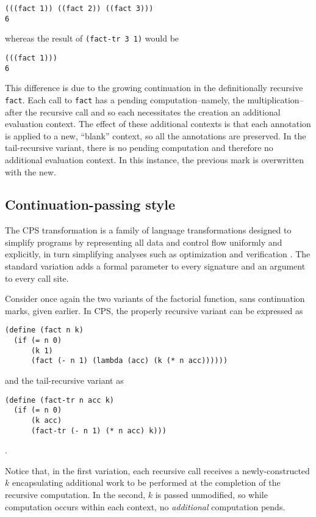 \documentclass[ms]{byuprop}
\newcounter{definition}
\begin{document}
\begin{verbatim}
(((fact 1)) ((fact 2)) ((fact 3)))
6
\end{verbatim}

whereas the result of \texttt{(fact-tr 3 1)} would be

\begin{verbatim}
(((fact 1)))
6
\end{verbatim}

This difference is due to the growing continuation in the definitionally recursive
\texttt{fact}. Each call to \texttt{fact} has a pending computation--namely, the
multiplication--after the recursive call and so each necessitates the creation an
additional evaluation context. The effect of these additional contexts is that each
annotation is applied to a new, ``blank'' context, so all the annotations are preserved. 
In the tail-recursive variant, there is no pending computation and therefore no additional
evaluation context. In this instance, the previous mark is overwritten with the new.

\subsection{Continuation-passing style}

The CPS transformation is a family of language transformations designed to simplify 
programs by representing all data and control flow uniformly and explicitly, in turn 
simplifying analyses such as optimization and verification \cite{sabry1994formal}. 
The standard variation adds a formal parameter to every signature and an argument to 
every call site. 

Consider once again the two variants of the factorial function, sans continuation marks, 
given earlier. In CPS, the properly recursive variant can be expressed as

\begin{verbatim}
(define (fact n k) 
  (if (= n 0)
      (k 1)
      (fact (- n 1) (lambda (acc) (k (* n acc))))))
\end{verbatim}

and the tail-recursive variant as

\begin{verbatim}
(define (fact-tr n acc k)
  (if (= n 0)
      (k acc)
      (fact-tr (- n 1) (* n acc) k)))
\end{verbatim}.

Notice that, in the first variation, each recursive call receives a newly-constructed 
$k$ encapsulating additional work to be performed at the completion of the recursive 
computation. In the second, $k$ is passed unmodified, so while computation occurs 
within each context, no \emph{additional} computation pends.
\end{document}
